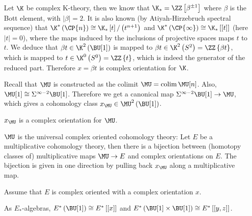 \begin{example}\label{cmplx-thy-1}
	Let $\K$ be complex K-theory, then we know that $\K_* = \ZZ\left[\beta^{\pm 1}\right]$ where $\beta$ is the Bott element, with $\left|\beta\right| = 2$.
	It is also known (by Atiyah-Hirzebruch spectral sequence) that
	$\K^*\left(\CP{n}\right) \cong \K_* \left[t\right] / \left(t^{n+1}\right)$
	and
	$\K^*\left(\CP{\infty}\right) \cong \K_* \left[\left[t\right]\right]$
	(here $\left|t\right| = 0$),
	where the maps induced by the inclusions of projective spaces maps $t$ to $t$.
	We deduce that $\beta t \in \K^2\left(\BU[1]\right)$ is mapped to $\beta t \in \K^2\left(S^2\right) = \ZZ\left\{\beta t\right\}$, which is mapped to $t \in \K^0\left(S^0\right) = \ZZ\left\{t\right\}$, which is indeed the generator of the reduced part.
	Therefore $x = \beta t$ is complex orientation for $\K$.
\end{example}

\begin{example}
	Recall that $\MU$ is constructed as the colimit $\MU = \colim \MU[n]$.
	Also, $\MU[1] \cong \Sigma^{\infty-2} \BU[1]$.
	Therefore we get a canonical map $\Sigma^{\infty-2} \BU[1] \to \MU$, which gives a cohomology class $x_{\MU} \in \MU^2\left(\BU[1]\right)$.
\end{example}

\begin{proposition}
	$x_{\MU}$ is a complex orientation for $\MU$.
\end{proposition}

\begin{theorem}
	$\MU$ is the universal complex oriented cohomology theory:
	Let $E$ be a multiplicative cohomology theory, then there is a bijection between (homotopy classes of) multiplicative maps $\MU \to E$ and complex orientations on $E$.
	The bijection is given in one direction by pulling back $x_{\MU}$ along a multiplicative map.
\end{theorem}

Assume that $E$ is complex oriented with a complex orientation $x$.

\begin{theorem}
	As $E_*$-algebras,
	$E^*\left(\BU[1]\right) \cong E^*\left[\left[x\right]\right]$
	and
	$E^*\left(\BU[1] \times \BU[1]\right) \cong E^*\left[\left[y,z\right]\right]$.
\end{theorem}

